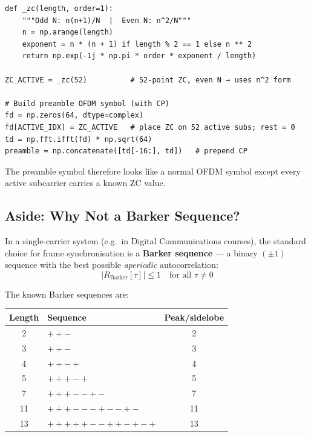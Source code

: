 \documentclass[11pt,a4paper]{article}
\begin{document}
\begin{lstlisting}
def _zc(length, order=1):
    """Odd N: n(n+1)/N  |  Even N: n^2/N"""
    n = np.arange(length)
    exponent = n * (n + 1) if length % 2 == 1 else n ** 2
    return np.exp(-1j * np.pi * order * exponent / length)

ZC_ACTIVE = _zc(52)          # 52-point ZC, even N → uses n^2 form

# Build preamble OFDM symbol (with CP)
fd = np.zeros(64, dtype=complex)
fd[ACTIVE_IDX] = ZC_ACTIVE   # place ZC on 52 active subs; rest = 0
td = np.fft.ifft(fd) * np.sqrt(64)
preamble = np.concatenate([td[-16:], td])   # prepend CP
\end{lstlisting}

The preamble symbol therefore looks like a normal OFDM symbol except every
active subcarrier carries a known ZC value.

\subsection{Aside: Why Not a Barker Sequence?}

In a single-carrier system (e.g.\ in Digital Communications courses), the
standard choice for frame synchronisation is a \textbf{Barker sequence} ---
a binary $(\pm 1)$ sequence with the best possible \emph{aperiodic}
autocorrelation:
\begin{equation}
  |R_{\text{Barker}}[\tau]| \leq 1 \quad \text{for all } \tau \neq 0
\end{equation}

The known Barker sequences are:

\begin{center}
\begin{tabular}{clc}
\toprule
\textbf{Length} & \textbf{Sequence} & \textbf{Peak/sidelobe} \\
\midrule
2  & $+{+}-$                                     & 2 \\
3  & $+{+}-$                                     & 3 \\
4  & $+{+}-{+}$                                  & 4 \\
5  & $+{+}{+}-{+}$                               & 5 \\
7  & $+{+}{+}--{+}-$                             & 7 \\
11 & $+{+}{+}---{+}--{+}-$                       & 11 \\
13 & $+{+}{+}{+}{+}--{+}{+}-{+}-{+}$            & 13 \\
\bottomrule
\end{tabular}
\end{center}
\end{document}
